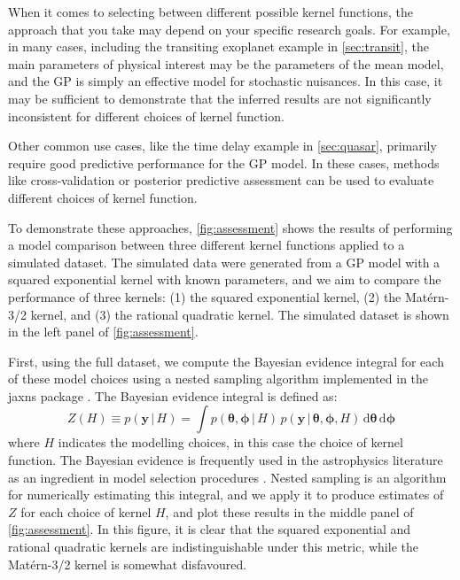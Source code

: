 \documentclass[letterpaper]{ar-1col}
\newcommand{\ydata}{\ensuremath{\boldsymbol{y}}}
\newcommand{\hyperparams}{\ensuremath{\boldsymbol{\phi}}}
\newcommand{\meanparams}{\ensuremath{\boldsymbol{\theta}}}
\begin{document}
When it comes to selecting between different possible kernel functions, the approach that you take may depend on your specific research goals.
For example, in many cases, including the transiting exoplanet example in \autoref{sec:transit}, the main parameters of physical interest may be the parameters of the mean model, and the GP is simply an effective model for stochastic nuisances.
In this case, it may be sufficient to demonstrate that the inferred results are not significantly inconsistent for different choices of kernel function.

Other common use cases, like the time delay example in \autoref{sec:quasar}, primarily require good predictive performance for the GP model.
In these cases, methods like cross-validation \citep[e.g.,][]{gelfand1992model} or posterior predictive assessment \citep[e.g.,][]{gelman1996posterior} can be used to evaluate different choices of kernel function.

To demonstrate these approaches, \autoref{fig:assessment} shows the results of performing a model comparison between three different kernel functions applied to a simulated dataset.
The simulated data were generated from a GP model with a squared exponential kernel with known parameters, and we aim to compare the performance of three kernels: (1) the squared exponential kernel, (2) the Mat\'ern-3/2 kernel, and (3) the rational quadratic kernel.
The simulated dataset is shown in the left panel of \autoref{fig:assessment}.

First, using the full dataset, we compute the Bayesian evidence integral for each of these model choices using a nested sampling algorithm implemented in the \textsf{jaxns} package \citep{jaxns}.
The Bayesian evidence integral is defined as:
\begin{equation}
  Z(H) \equiv p(\ydata\,|\,H) = \int p(\meanparams,\hyperparams\,|\,H)\,p(\ydata\,|\,\meanparams,\hyperparams,H)\,\mathrm{d}\meanparams\,\mathrm{d}\hyperparams
\end{equation}
where $H$ indicates the modelling choices, in this case the choice of kernel function.
The Bayesian evidence is frequently used in the astrophysics literature as an ingredient in model selection procedures \citep[see][for a more detailed discussion]{2008ConPh..49...71T}.
Nested sampling is an algorithm for numerically estimating this integral, and we apply it to produce estimates of $Z$ for each choice of kernel $H$, and plot these results in the middle panel of \autoref{fig:assessment}.
In this figure, it is clear that the squared exponential and rational quadratic kernels are indistinguishable under this metric, while the Mat\'ern-3/2 kernel is somewhat disfavoured. 
\end{document}
